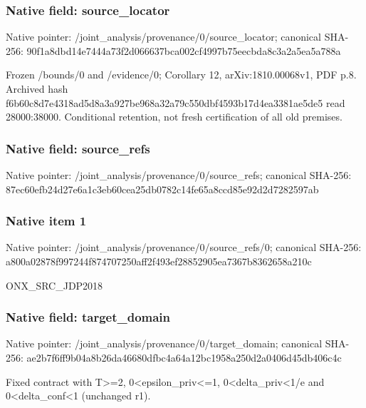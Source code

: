 \documentclass[10pt,a4paper]{article}
\begin{document}
\subsubsection{Native field: source\_\allowbreak{}locator}
Native pointer: /joint\_\allowbreak{}analysis/provenance/0/source\_\allowbreak{}locator; canonical SHA-256: 90f1a8dbd14e7444a73f2d066637bca002cf4997b75eecbda8c3a2a5ea5a788a

\begingroup\raggedright\sloppy Frozen /\allowbreak{}bounds/\allowbreak{}0 and /\allowbreak{}evidence/\allowbreak{}0;\allowbreak{} Corollary 12,\allowbreak{} arXiv:\allowbreak{}1810.00068v1,\allowbreak{} PDF p.8. Archived hash f6b60c8d7e4318ad5d8a3a927be968a32a79c550dbf4593b17d4ea3381ae5de5 read 28000:\allowbreak{}38000. Conditional retention,\allowbreak{} not fresh certification of all old premises.\par\endgroup

\subsubsection{Native field: source\_\allowbreak{}refs}
Native pointer: /joint\_\allowbreak{}analysis/provenance/0/source\_\allowbreak{}refs; canonical SHA-256: 87ec60efb24d27e6a1c3eb60cea25db0782c14fe65a8ccd85e92d2d7282597ab

\subsubsection{Native item 1}
Native pointer: /joint\_\allowbreak{}analysis/provenance/0/source\_\allowbreak{}refs/0; canonical SHA-256: a800a02878f997244f874707250aff2f493ef28852905ea7367b8362658a210c

\begingroup\raggedright\sloppy ONX\_\allowbreak{}SRC\_\allowbreak{}JDP2018\par\endgroup

\subsubsection{Native field: target\_\allowbreak{}domain}
Native pointer: /joint\_\allowbreak{}analysis/provenance/0/target\_\allowbreak{}domain; canonical SHA-256: ae2b7f6ff9b04a8b26da46680dfbc4a64a12bc1958a250d2a0406d45db406c4c

\begingroup\raggedright\sloppy Fixed contract with T>=\allowbreak{}2,\allowbreak{} 0<epsilon\_\allowbreak{}priv<=\allowbreak{}1,\allowbreak{} 0<delta\_\allowbreak{}priv<1/\allowbreak{}e and 0<delta\_\allowbreak{}conf<1 (unchanged r1).\par\endgroup
\end{document}
